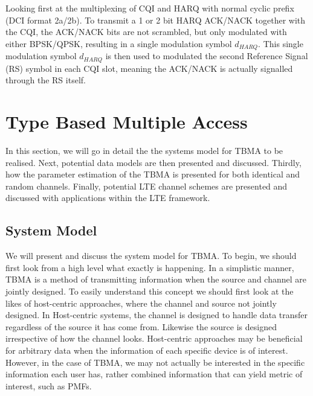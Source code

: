 \documentclass{article}
\begin{document}
Looking first at the multiplexing of CQI and HARQ with normal cyclic prefix (DCI format 2a/2b). To transmit a 1 or 2 bit HARQ ACK/NACK together with the CQI, the ACK/NACK bits are not scrambled, but only modulated with either BPSK/QPSK, resulting in a single modulation symbol $d_{HARQ}$.  This single modulation symbol $d_{HARQ}$ is then used to modulated the second Reference Signal (RS) symbol in each CQI slot, meaning the ACK/NACK is actually signalled through the RS itself.





\section{Type Based Multiple Access}\label{tbma_sec}
In this section, we will go in detail the the systems model for TBMA to be realised. Next, potential data models are then presented and discussed. Thirdly, how the parameter estimation of the TBMA is presented for both identical and random channels. Finally, potential LTE channel schemes are presented and discussed with applications within the LTE framework. 
\subsection{System Model}\label{sys_mod}
We will present and discuss the system model for TBMA. To begin, we should first look from a high level what exactly is happening. In a simplistic manner, TBMA is a method of transmitting information when the source and channel are jointly designed. To easily understand this concept we should first look at the likes of host-centric approaches, where the channel and source not jointly designed. In Host-centric systems, the channel is designed to handle data transfer regardless of the source it has come from. Likewise the source is designed irrespective of how the channel looks. Host-centric approaches may be beneficial for arbitrary data when the information of each specific device is of interest. However, in the case of TBMA, we may not actually be interested in the specific information each user has, rather combined information that can yield metric of interest, such as PMFs. 
\end{document}
